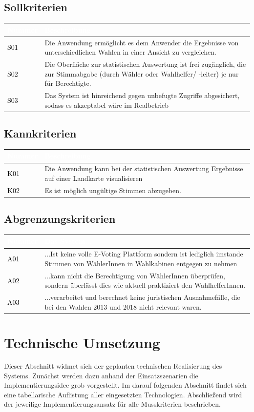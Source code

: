 \documentclass[a4paper,12pt]{article}
\newcommand\addrow[2]{\textcolor{black}{#1} &#2\\ \hline}
\newcommand\addheading[2]{\rowcolor{TUMBlue}\textcolor{white}{#1} & \textcolor{white}{#2}\\ \hline}
\newcommand\tabularhead{\begin{tabular}{|b|p{13cm}|}
\hline
}
\newenvironment{usecase}{\tabularhead}
{\hline\end{tabular}}
\begin{document}
\subsection{Sollkriterien}
\begin{usecase}
	\addheading{Nummer}{Beschreibung} 
	\addrow{S01}{Die Anwendung ermöglicht es dem Anwender die Ergebnisse von unterschiedlichen Wahlen in einer Ansicht zu vergleichen.}
      \addrow{S02}{Die Oberfläche zur statistischen Auswertung ist frei zugänglich, die zur Stimmabgabe (durch Wähler oder Wahlhelfer/ -leiter) je nur für Berechtigte.}
      \addrow{S03}{Das System ist hinreichend gegen unbefugte Zugriffe abgesichert, sodass es akzeptabel wäre im Realbetrieb}
\end{usecase}
\subsection{Kannkriterien}
\begin{usecase}
	\addheading{Nummer}{Beschreibung} 
	\addrow{K01}{Die Anwendung kann bei der statistischen Auswertung Ergebnisse auf einer Landkarte visualisieren}
      \addrow{K02}{Es ist möglich ungültige Stimmen abzugeben.}
\end{usecase}

\subsection{Abgrenzungskriterien}
\begin{usecase}
      \addheading{Nummer}{Das System...} 
      \addrow{A01}{...Ist keine volle E-Voting Plattform sondern ist lediglich imstande Stimmen von WählerInnen in Wahlkabinen entgegen zu nehmen}
	\addrow{A02}{...kann nicht die Berechtigung von WählerInnen überprüfen, sondern überlässt dies wie aktuell praktiziert den WahlhelferInnen.}
	\addrow{A03}{...verarbeitet und berechnet keine juristischen Ausnahmefälle, die bei den Wahlen 2013 und 2018 nicht relevant waren.}
\end{usecase}

\section{Technische Umsetzung}
Dieser Abschnitt widmet sich der geplanten technischen Realisierung
des Systems. Zunächst werden dazu anhand der Einsatzszenarien die Implementierungsidee
grob vorgestellt. Im darauf folgenden Abschnitt findet sich eine tabellarische 
Auflistung aller eingesetzten Technologien. Abschließend
wird der jeweilige Implementierungsansatz für alle Musskriterien beschrieben.
\end{document}
